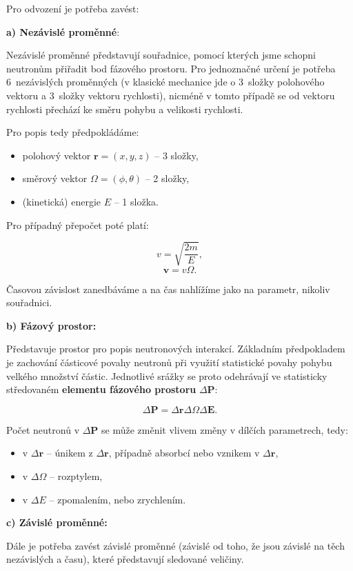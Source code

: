 Pro odvození je potřeba zavést:

\textbf{a) Nezávislé proměnné}:

Nezávislé proměnné představují souřadnice, pomocí kterých jsme schopni neutronům přiřadit bod fázového prostoru. Pro jednoznačné určení je potřeba 6~nezávislých proměnných (v klasické mechanice jde o 3~složky polohového vektoru a 3~složky vektoru rychlosti), nicméně v tomto případě se od vektoru rychlosti přechází ke směru pohybu a velikosti rychlosti.

Pro popis tedy předpokládáme:

\begin{itemize}
  \item polohový vektor $\textbf{r} = (x, y, z)$ -- 3 složky,
  \item směrový vektor $\Omega = (\phi, \theta)$ -- 2 složky,
  \item (kinetická) energie $E$ -- 1 složka.
\end{itemize}

Pro případný přepočet poté platí:

$$ v = \sqrt{\dfrac{2m}{E}}, $$
$$ \textbf{v} = v \Omega. $$

Časovou závislost zanedbáváme a na čas nahlížíme jako na parametr, nikoliv souřadnici.

\textbf{b) Fázový prostor:}

Představuje prostor pro popis neutronových interakcí. Základním předpokladem je zachování částicové povahy neutronů při využití statistické povahy pohybu velkého množství částic. Jednotlivé srážky se proto odehrávají ve statisticky středovaném \textbf{elementu fázového prostoru} $\Delta \textbf{P}$:

$$ \Delta \textbf{P} = \Delta \textbf{r} \Delta \Omega \Delta \textbf{E}. $$

Počet neutronů v $\Delta \textbf{P}$ se může změnit vlivem změny v dílčích parametrech, tedy:

\begin{itemize}
  \item v $\Delta \textbf{r}$ -- únikem z $\Delta \textbf{r}$, případně absorbcí nebo vznikem v $\Delta \textbf{r}$,
  \item v $\Delta \Omega$ -- rozptylem,
  \item v $\Delta E$ -- zpomalením, nebo zrychlením.
\end{itemize}

\textbf{c) Závislé proměnné:}

Dále je potřeba zavést závislé proměnné (závislé od toho, že jsou závislé na těch nezávislých a času), které představují sledované veličiny.

